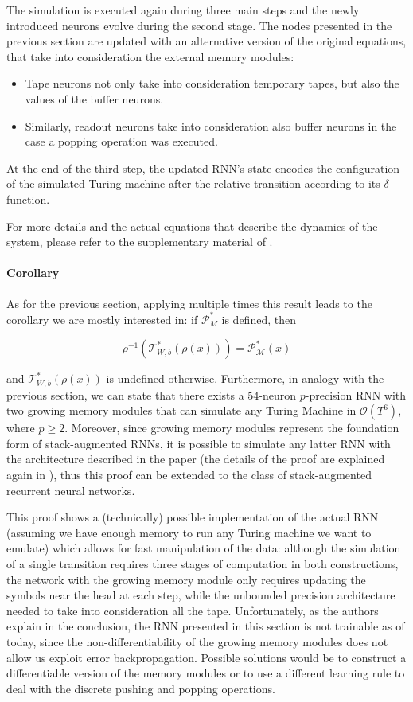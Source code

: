 \documentclass{article}
\begin{document}
The simulation is executed again during three main steps and the newly introduced neurons evolve during the second stage. The nodes presented in the previous section are updated with an alternative version of the original equations, that take into consideration the external memory modules:

\begin{itemize}
    \item Tape neurons not only take into consideration temporary tapes, but also the values of the buffer neurons.
    \item Similarly, readout neurons take into consideration also buffer neurons in the case a popping operation was executed.
\end{itemize}

At the end of the third step, the updated RNN's state encodes the configuration of the simulated Turing machine after the relative transition according to its $\delta$ function.

For more details and the actual equations that describe the dynamics of the system, please refer to the supplementary material of \cite{CHU21}.

\paragraph{Corollary}
As for the previous section, applying multiple times this result leads to the corollary we are mostly interested in: if $\mathcal{P}^{*}_{M}$ is defined, then

$$\rho^{-1}(\mathcal{T}^*_{W,b}(\rho(x))) = \mathcal{P}^*_{\mathcal{M}}(x)$$

and $\mathcal{T}^*_{W,b}(\rho(x))$ is undefined otherwise.
Furthermore, in analogy with the previous section, we can state that there exists a $54$-neuron $p$-precision RNN with two growing memory modules that can simulate any Turing Machine in $\mathcal{O}(T^6)$, where $p \geq 2$. Moreover, since growing memory modules represent the foundation form of stack-augmented RNNs, it is possible to simulate any latter RNN with the architecture described in the paper (the details of the proof are explained again in \cite{CHU21}), thus this proof can be extended to the class of stack-augmented recurrent neural networks.

This proof shows a (technically) possible implementation of the actual RNN (assuming we have enough memory to run any Turing machine we want to emulate) which allows for fast manipulation of the data: although the simulation of a single transition requires three stages of computation in both constructions, the network with the growing memory module only requires updating the symbols near the head at each step, while the unbounded precision architecture needed to take into consideration all the tape.
Unfortunately, as the authors explain in the conclusion, the RNN presented in this section is not trainable as of today, since the non-differentiability of the growing memory modules does not allow us exploit error backpropagation. Possible solutions would be to construct a differentiable version of the memory modules or to use a different learning rule to deal with the discrete pushing and popping operations.
\end{document}
